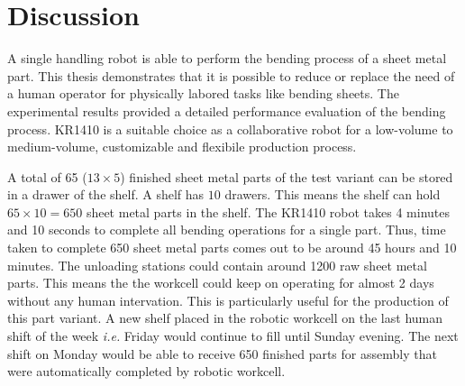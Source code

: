 \chapter{Discussion}
\label{chap:discussion}
A single handling robot is able to perform the bending process of a sheet metal part. This thesis demonstrates that it is possible to reduce or replace the need of a human operator for physically labored tasks like bending sheets. The experimental results provided a detailed performance evaluation of the bending process. KR1410 is a suitable choice as a collaborative robot for a low-volume to medium-volume, customizable and flexibile production process.

A total of 65 ($13 \times 5$) finished sheet metal parts of the test variant can be stored in a drawer of the shelf. A shelf has $10$ drawers. This means the shelf can hold $65 \times 10 = 650$ sheet metal parts in the shelf. The KR1410 robot takes 4 minutes and 10 seconds to complete all bending operations for a single part. Thus, time taken to complete 650 sheet metal parts comes out to be around 45 hours and 10 minutes.
The unloading stations could contain around 1200 raw sheet metal parts. This means the the workcell could keep on operating for almost 2 days without any human intervation. This is particularly useful for the production of this part variant. A new shelf placed in the robotic workcell on the last human shift of the week \textit{i.e.} Friday would continue to fill until Sunday evening. The next shift on Monday would be able to receive 650 finished parts for assembly that were automatically completed by robotic workcell.


